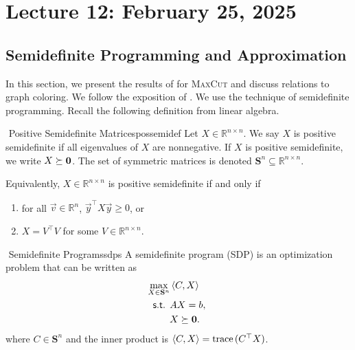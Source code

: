 \pagebreak

\section{Lecture 12: February 25, 2025}

    \subsection{Semidefinite Programming and Approximation}

        In this section, we present the results of \cite{goemans1995improvedmaxcut} for \textsc{MaxCut} and discuss relations to graph coloring. We follow the exposition of \cite{williamson2011design}. We use the technique of semidefinite programming. Recall the following definition from linear algebra.
        \begin{definition}{\Stop\,\,Positive Semidefinite Matrices}{possemidef}
            Let \(X\in\mathbb{R}^{n\times n}\). We say \(X\) is positive semidefinite if all eigenvalues of \(X\) are nonnegative. If \(X\) is positive semidefinite, we write \(X\succeq\mathbf{0}\). The set of symmetric matrices is denoted \(\mathbf{S}^n\subseteq \mathbb{R}^{n\times n}\).
        \end{definition}
        \begin{remark*}
            Equivalently, \(X\in\mathbb{R}^{n\times n}\) is positive semidefinite if and only if 
            \begin{enumerate}
                \item for all \(\vec{v}\in\mathbb{R}^n\), \(\vec{y}^\top X\vec{y}\geq0\), or 
                \item \(X=V^\top V\) for some \(V\in\mathbb{R}^{n\times n}\).
            \end{enumerate}
        \end{remark*}
        \begin{definition}{\Stop\,\,Semidefinite Programs}{sdps}
            A semidefinite program (SDP) is an optimization problem that can be written as
            \begin{align*}
                \max_{X\in \mathbf{S}^n} &\left\langle C,X\right\rangle \quad \\
                \textsf{s.t. }&AX=b, \\
                &X \succeq\mathbf{0}.
            \end{align*}
            where \(C\in \mathbf{S}^n\) and the inner product is \(\left\langle C,X\right\rangle=\text{trace\,}(C^\top X)\).
        \end{definition}
